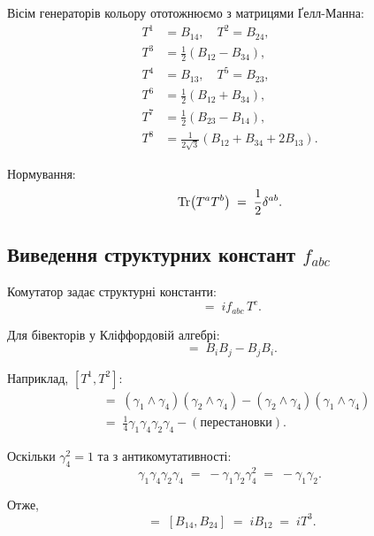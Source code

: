 \documentclass[11pt,a4paper]{article}
\theoremstyle{definition}
\theoremstyle{plain}
\theoremstyle{remark}
\begin{document}
Вісім генераторів кольору ототожнюємо з матрицями Ґелл-Манна:
\begin{align}
T^1 &= B_{14}, \quad T^2 = B_{24}, \nonumber \\
T^3 &= \frac{1}{2}(B_{12} - B_{34}), \nonumber \\
T^4 &= B_{13}, \quad T^5 = B_{23}, \nonumber \\
T^6 &= \frac{1}{2}(B_{12} + B_{34}), \nonumber \\
T^7 &= \frac{1}{2}(B_{23} - B_{14}), \nonumber \\
T^8 &= \frac{1}{2\sqrt{3}}(B_{12} + B_{34} + 2B_{13}).
\label{eq:color-generators}
\end{align}

Нормування:
\begin{equation}
\Tr(T^a T^b) \;=\; \frac{1}{2}\delta^{ab}.
\end{equation}

\subsection{Виведення структурних констант $f_{abc}$}

Комутатор задає структурні константи:
\begin{equation}
[T^a,T^b] \;=\; i f_{abc}\,T^c.
\label{eq:commutator}
\end{equation}

Для бівекторів у Кліффордовій алгебрі:
\begin{equation}
[B_i,B_j] \;=\; B_i B_j - B_j B_i.
\end{equation}

Наприклад, $[T^1,T^2]$:
\begin{align}
[B_{14},B_{24}] &\;=\; (\gamma_1\wedge\gamma_4)(\gamma_2\wedge\gamma_4) - (\gamma_2\wedge\gamma_4)(\gamma_1\wedge\gamma_4) \nonumber \\
&\;=\; \frac{1}{4}\gamma_1\gamma_4\gamma_2\gamma_4 - (\text{перестановки}).
\end{align}

Оскільки $\gamma_4^2=1$ та з антикомутативності:
\begin{equation}
\gamma_1\gamma_4\gamma_2\gamma_4 \;=\; -\gamma_1\gamma_2\gamma_4^2 \;=\; -\gamma_1\gamma_2.
\end{equation}

Отже,
\begin{equation}
[T^1,T^2] \;=\; [B_{14},B_{24}] \;=\; i B_{12} \;=\; i T^3.
\end{equation}
\end{document}
